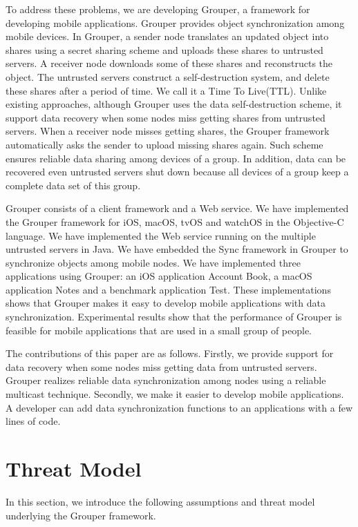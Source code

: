 \documentclass[twocolumn,10pt]{article}
\begin{document}
To address these problems, we are developing Grouper, a framework for developing mobile applications. 
Grouper provides object synchronization among mobile devices.
In Grouper, a sender node translates an updated object into shares using a secret sharing scheme and uploads these shares to untrusted servers. 
A receiver node downloads some of these shares and reconstructs the object.
The untrusted servers construct a self-destruction system, and delete these shares after a period of time.
We call it a Time To Live(TTL).
Unlike existing approaches, although Grouper uses the data self-destruction scheme, it support data recovery when some nodes miss getting shares from untrusted servers.
When a receiver node misses getting shares, the Grouper framework automatically asks the sender to upload missing shares again.
Such scheme ensures reliable data sharing among devices of a group.
In addition, data can be recovered even untrusted servers shut down because all devices of a group keep a complete data set of this group.

Grouper consists of a client framework and a Web service.
We have implemented the Grouper framework for iOS, macOS, tvOS and watchOS in the Objective-C language.
We have implemented the Web service running on the multiple untrusted servers in Java. 
We have embedded the Sync framework in Grouper to synchronize objects among mobile nodes.
We have implemented three applications using Grouper: an iOS application Account Book, a macOS application Notes and a benchmark application Test.
These implementations shows that Grouper makes it easy to develop mobile applications with data synchronization.
Experimental results show that the performance of Grouper is feasible for mobile applications that are used in a small group of people.

The contributions of this paper are as follows.
Firstly, we provide support for data recovery when some nodes miss getting data from untrusted servers.
Grouper realizes reliable data synchronization among nodes using a reliable multicast technique.
Secondly, we make it easier to develop mobile applications.
A developer can add data synchronization functions to an applications with a few lines of code.

\section{Threat Model}

In this section, we introduce the following assumptions and threat model underlying the Grouper framework.
\end{document}
